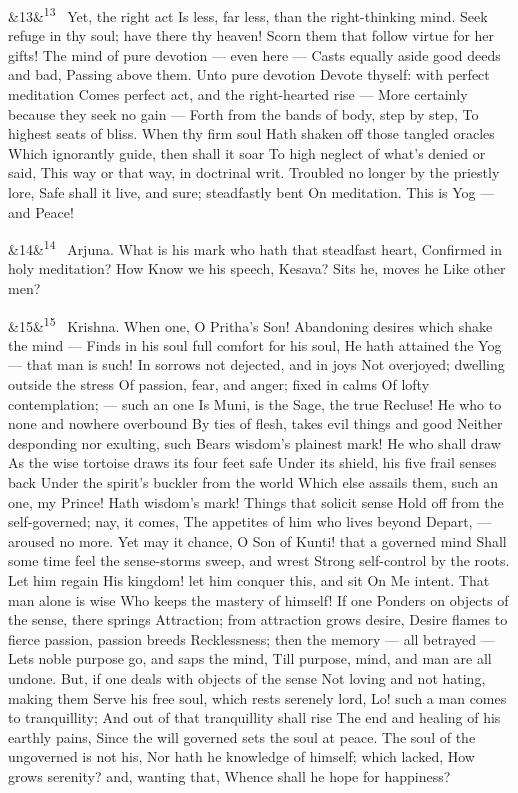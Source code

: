 \documentclass[12pt]{article}
\newcommand{\para}[1][]{\par\noindent\ifx&#1&\else\textsuperscript{\footnotesize #1}~\fi}
\begin{document}
\para[13] Yet, the right act Is less, far less, than the right-thinking mind. Seek refuge in thy soul; have there thy heaven! Scorn them that follow virtue for her gifts! The mind of pure devotion --- even here --- Casts equally aside good deeds and bad, Passing above them. Unto pure devotion Devote thyself: with perfect meditation Comes perfect act, and the right-hearted rise --- More certainly because they seek no gain --- Forth from the bands of body, step by step, To highest seats of bliss. When thy firm soul Hath shaken off those tangled oracles Which ignorantly guide, then shall it soar To high neglect of what's denied or said, This way or that way, in doctrinal writ. Troubled no longer by the priestly lore, Safe shall it live, and sure; steadfastly bent On meditation. This is Yog --- and Peace!

\para[14] Arjuna. What is his mark who hath that steadfast heart, Confirmed in holy meditation? How Know we his speech, Kesava? Sits he, moves he Like other men?

\para[15] Krishna. When one, O Pritha's Son! Abandoning desires which shake the mind --- Finds in his soul full comfort for his soul, He hath attained the Yog --- that man is such! In sorrows not dejected, and in joys Not overjoyed; dwelling outside the stress Of passion, fear, and anger; fixed in calms Of lofty contemplation; --- such an one Is Muni, is the Sage, the true Recluse! He who to none and nowhere overbound By ties of flesh, takes evil things and good Neither desponding nor exulting, such Bears wisdom's plainest mark! He who shall draw As the wise tortoise draws its four feet safe Under its shield, his five frail senses back Under the spirit's buckler from the world Which else assails them, such an one, my Prince! Hath wisdom's mark! Things that solicit sense Hold off from the self-governed; nay, it comes, The appetites of him who lives beyond Depart, --- aroused no more. Yet may it chance, O Son of Kunti! that a governed mind Shall some time feel the sense-storms sweep, and wrest Strong self-control by the roots. Let him regain His kingdom! let him conquer this, and sit On Me intent. That man alone is wise Who keeps the mastery of himself! If one Ponders on objects of the sense, there springs Attraction; from attraction grows desire, Desire flames to fierce passion, passion breeds Recklessness; then the memory --- all betrayed --- Lets noble purpose go, and saps the mind, Till purpose, mind, and man are all undone. But, if one deals with objects of the sense Not loving and not hating, making them Serve his free soul, which rests serenely lord, Lo! such a man comes to tranquillity; And out of that tranquillity shall rise The end and healing of his earthly pains, Since the will governed sets the soul at peace. The soul of the ungoverned is not his, Nor hath he knowledge of himself; which lacked, How grows serenity? and, wanting that, Whence shall he hope for happiness?
\end{document}

